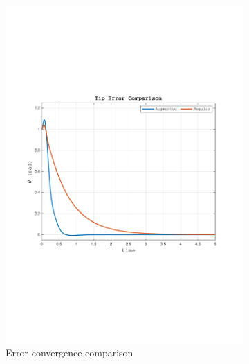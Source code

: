 \documentclass[a4paper, 12pt]{article}
\begin{document}
\begin{figure}[h!]
    \begin{subfigure}[b]{0.45\textwidth}
        \includegraphics[width=\textwidth]
        {Figures/fig13a.pdf}
            \caption{Error convergence comparison}
        \label{fig:fig13a}
    \end{subfigure}
    \begin{subfigure}[b]{0.45\textwidth}

\end{subfigure}
\end{figure}
\end{document}

